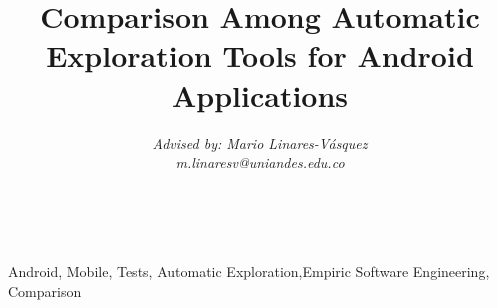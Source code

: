 \documentclass[conference]{IEEEtran}
\begin{document}
\title{Comparison Among Automatic Exploration Tools for Android Applications}

\author{
\textit{Advised by: Mario Linares-Vásquez}\\
\textit{m.linaresv@uniandes.edu.co}
}

\maketitle

\\

\begin{IEEEkeywords}
Android, Mobile, Tests, Automatic Exploration,Empiric Software Engineering, Comparison
\end{IEEEkeywords}
















\end{document}
